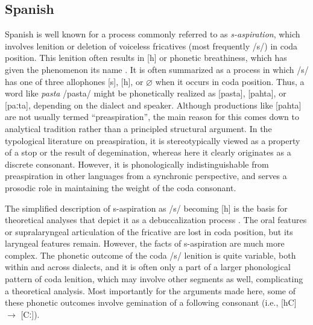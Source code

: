 \documentclass[output=paper,colorlinks,citecolor=brown]{langscibook}
\begin{document}
\subsection{Spanish}
\label{sec-spanish}


Spanish is well known for a process commonly referred to as \textit{s-aspiration}, which involves lenition or deletion of voiceless fricatives (most frequently /s/) in coda position. This lenition often results in [h] or phonetic breathiness, which has given the phenomenon its name \citep{torreira2012}. It is often summarized as a process in which /s/ has one of three allophones [s], [h], or $\varnothing$ \citep[often with compensatory lengthening of the preceding vowel; e.g.,][]{lipski1984,lipski1994,obrien2012,walkeretal2014} when it occurs in coda position. Thus, a word like \textit{pasta} /pasta/ might be phonetically realized as [pasta], [pahta], or [paːta], depending on the dialect and speaker. Although productions like [pahta] are not usually termed ``preaspiration'', the main reason for this comes down to analytical tradition rather than a principled structural argument. In the typological literature on preaspiration, it is stereotypically viewed as a property of a stop or the result of degemination, whereas here it clearly originates as a discrete consonant. However, it is phonologically indistinguishable from preaspiration in other languages from a synchronic perspective, and serves a prosodic role in maintaining the weight of the coda consonant.

The simplified description of s-aspiration as /s/ becoming [h] is the basis for theoretical analyses that depict it as a debuccalization process \citep[e.g.,][]{goldsmith1981,vaux1998,obrien2012}. The oral features or supralaryngeal articulation of the fricative are lost in coda position, but its laryngeal features remain. %
However, the facts of s-aspiration are much more complex. The phonetic outcome of the coda /s/ lenition is quite variable, both within and across dialects, and it is often only a part of a larger phonological pattern of coda lenition, which may involve other segments as well, complicating a theoretical analysis. Most importantly for the arguments made here, some of these phonetic outcomes involve gemination of a following consonant (i.e., [hC] $\rightarrow$ [Cː]).%
\end{document}
